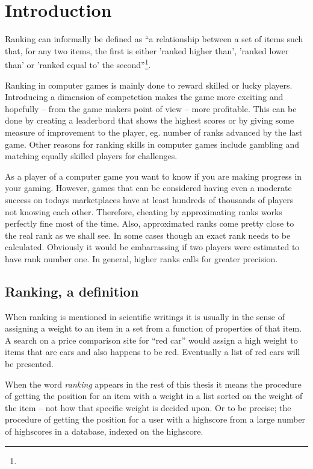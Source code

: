 \chapter{Introduction}

Ranking can informally be defined as ``a relationship between a set of items such that, for any two items, the first is either 'ranked higher than', 'ranked lower than' or 'ranked equal to' the second''\footnote{}.

Ranking in computer games is mainly done to reward skilled or lucky players. Introducing a dimension of competetion makes the game more exciting and hopefully -- from the game makers point of view -- more profitable. This can be done by creating a leaderbord that shows the highest scores or by giving some measure of improvement to the player, eg. number of ranks advanced by the last game. Other reasons for ranking skills in computer games include gambling and matching equally skilled players for challenges.

As a player of a computer game you want to know if you are making progress in your gaming. However, games that can be considered having even a moderate success on todays marketplaces have at least hundreds of thousands of players not knowing each other. Therefore, cheating by approximating ranks works perfectly fine most of the time. Also, approximated ranks come pretty close to the real rank as we shall see. In some cases though an exact rank needs to be calculated. Obviously it would be embarrassing if two players were estimated to have rank number one. In general, higher ranks calls for greater precision.

\section{Ranking, a definition}

When ranking is mentioned in scientific writings it is usually in the sense of assigning a weight to an item in a set from a function of properties of that item. A search on a price comparison site for ``red car'' would assign a high weight to items that are cars and also happens to be red. Eventually a list of red cars will be presented.

When the word \emph{ranking} appears in the rest of this thesis it means the procedure of getting the position for an item with a weight in a list sorted on the weight of the item -- not how that specific weight is decided upon. Or to be precise; the procedure of getting the position for a user with a highscore from a large number of highscores in a database, indexed on the highscore.

